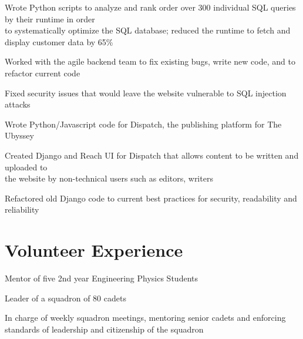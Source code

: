 \documentclass[]{deedy-resume-openfont}
\begin{document}
	\begin{tightemize}
		\item Wrote Python scripts to analyze and rank order over 300 individual SQL queries by their runtime in order \\ to systematically optimize the SQL database; reduced the runtime to fetch and display customer data by 65\%
		\item Worked with the agile backend team to fix existing bugs, write new code, and to refactor current code
		\item Fixed security issues that would leave the website vulnerable to SQL injection attacks
	\end{tightemize}
	\vspace{8pt}
	
	\begin{tightemize}
		\item Wrote Python/Javascript code for Dispatch, the publishing platform for The Ubyssey
		\item Created Django and Reach UI for Dispatch that allows content to be written and uploaded to \\ the website by non-technical users such as editors, writers
		\item Refactored old Django code to current best practices for security, readability and reliability
	\end{tightemize}
	\vspace{10pt}
	
	\section{Volunteer Experience}
	\begin{tightemize}
		\item Mentor of five 2nd year Engineering Physics Students
	\end{tightemize}
	\vspace{8pt}
	
	\begin{tightemize}
		\item Leader of a squadron of 80 cadets
		\item In charge of weekly squadron meetings, mentoring senior cadets and enforcing standards of leadership and citizenship of the squadron
	\end{tightemize}
	\vspace{10pt}
	
\end{document}
